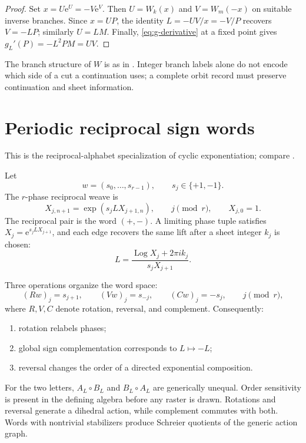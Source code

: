 \documentclass[11pt]{article}
\theoremstyle{definition}
\theoremstyle{remark}
\newcommand{\Logp}{\operatorname{Log}}
\newcommand{\e}{\mathrm e}
\begin{document}
\begin{proof}
Set $x=U\e^U=-V\e^V$.  Then $U=W_k(x)$ and $V=W_m(-x)$ on suitable inverse branches.  Since $x=UP$, the identity $L=-UV/x=-V/P$ recovers $V=-LP$; similarly $U=LM$.  Finally, \cref{eq:g-derivative} at a fixed point gives $g_L'(P)=-L^2PM=UV$.
\end{proof}

The branch structure of $W$ is as in \citet{CorlessEtAl1996}.  Integer branch labels alone do not encode which side of a cut a continuation uses; a complete orbit record must preserve continuation and sheet information.

\section{Periodic reciprocal sign words}

This is the reciprocal-alphabet specialization of cyclic exponentiation; compare \citet{BakerRippon1989,Bulanov2010}.

Let
\[
  w=(s_0,\ldots,s_{r-1}),\qquad s_j\in\{+1,-1\}.
\]
The $r$-phase reciprocal weave is
\begin{equation}
  X_{j,n+1}=\exp(s_jL X_{j+1,n}),
  \qquad j\pmod r,
  \qquad X_{j,0}=1.
  \label{eq:sign-word}
\end{equation}
The reciprocal pair is the word $(+,-)$.  A limiting phase tuple satisfies $X_j=\e^{s_jLX_{j+1}}$, and each edge recovers the same lift after a sheet integer $k_j$ is chosen:
\begin{equation}
  L=\frac{\Logp X_j+2\pi i k_j}{s_jX_{j+1}}.
  \label{eq:edge-recovery}
\end{equation}

Three operations organize the word space:
\begin{equation}
  (Rw)_j=s_{j+1},\qquad
  (Vw)_j=s_{-j},\qquad
  (Cw)_j=-s_j,
  \qquad j\pmod r,
  \label{eq:RVC}
\end{equation}
where $R,V,C$ denote rotation, reversal, and complement.  Consequently:
\begin{enumerate}[label=(\roman*),leftmargin=2em]
  \item rotation relabels phases;
  \item global sign complementation corresponds to $L\mapsto-L$;
  \item reversal changes the order of a directed exponential composition.
\end{enumerate}
For the two letters, $A_L\circ B_L$ and $B_L\circ A_L$ are generically unequal.  Order sensitivity is present in the defining algebra before any raster is drawn.  Rotations and reversal generate a dihedral action, while complement commutes with both.  Words with nontrivial stabilizers produce Schreier quotients of the generic action graph.
\end{document}
